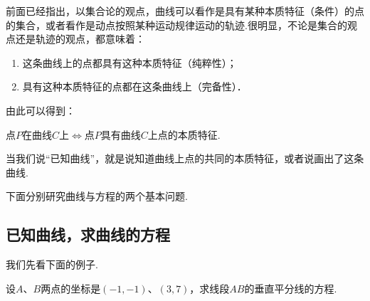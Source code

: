 前面已经指出，以集合论的观点，曲线可以看作是具有某种本质特征（条件）的点的集合，或者看作是动点按照某种运动规律运动的轨迹.很明显，不论是集合的观点还是轨迹的观点，都意味着：
\begin{enumerate}[(1)]
\item 这条曲线上的点都具有这种本质特征（纯粹性）；
\item 具有这种本质特征的点都在这条曲线上（完备性）．
\end{enumerate}
由此可以得到：

点$P$在曲线$C$上$\Longleftrightarrow$点$P$具有曲线$C$上点的本质特征.

当我们说“已知曲线”，就是说知道曲线上点的共同的本质特征，或者说画出了这条曲线.

下面分别研究曲线与方程的两个基本问题.

\subsection{已知曲线，求曲线的方程}

我们先看下面的例子.

\begin{example}
 设$A$、$B$两点的坐标是$(-1,-1)$、$(3,7)$，求线段$AB$的垂直平分线的方程.
\end{example}

